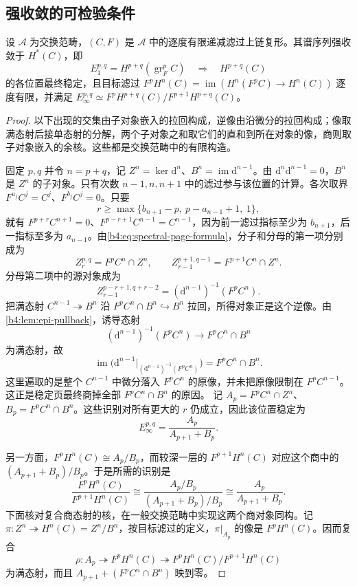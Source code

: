\subsection{强收敛的可检验条件}
\label{b4:subsec:1403:02}

\begin{theorem}\label{b4:thm:finite-filtration-convergence}
	设 \(\mathcal A\) 为交换范畴，\((C,F)\) 是 \(\mathcal A\) 中的逐度有限递减滤过上链复形。其谱序列强收敛于 \(H^*(C)\)，即
	\[
		E_1^{p,q}=H^{p+q}(\operatorname{gr}_F^pC) \quad\Longrightarrow\quad H^{p+q}(C)
	\]
	的各位置最终稳定，且目标滤过 \(F^pH^n(C)=\operatorname{im}(H^n(F^pC)\to H^n(C))\) 逐度有限，并满足 \(E_\infty^{p,q}\simeq F^pH^{p+q}(C)/F^{p+1}H^{p+q}(C)\)。
\end{theorem}
\begin{proof}
	以下出现的交集由子对象嵌入的拉回构成，逆像由沿微分的拉回构成；像取满态射后接单态射的分解，两个子对象之和取它们的直和到所在对象的像，商则取子对象嵌入的余核。这些都是交换范畴中的有限构造。

	固定 \(p,q\) 并令 \(n=p+q\)，记 \(Z^n=\ker \mathrm d^n\)、\(B^n=\operatorname{im}\mathrm d^{n-1}\)。由 \(\mathrm d^n\mathrm d^{n-1}=0\)，\(B^n\) 是 \(Z^n\) 的子对象。只有次数 \(n-1,n,n+1\) 中的滤过参与该位置的计算。各次取界 \(F^{a_j}C^j=C^j\)、\(F^{b_j}C^j=0\)。只要
	\[
		r\ge\max\{b_{n+1}-p,\ p-a_{n-1}+1,\ 1\},
	\]
	就有 \(F^{p+r}C^{n+1}=0\)、\(F^{p-r+1}C^{n-1}=C^{n-1}\)，因为前一滤过指标至少为 \(b_{n+1}\)，后一指标至多为 \(a_{n-1}\)。由\eqref{b4:eq:spectral-page-formula}，分子和分母的第一项分别成为
	\[
		Z_r^{p,q}=F^pC^n\cap Z^n,\qquad Z_{r-1}^{p+1,q-1}=F^{p+1}C^n\cap Z^n.
	\]
	分母第二项中的源对象成为
	\[
		Z_{r-1}^{p-r+1,q+r-2} =(\mathrm d^{n-1})^{-1}(F^pC^n).
	\]
	把满态射 \(C^{n-1}\twoheadrightarrow B^n\) 沿 \(F^pC^n\cap B^n\hookrightarrow B^n\) 拉回，所得对象正是这个逆像。由\cref{b4:lem:epi-pullback}，诱导态射
	\[
		(\mathrm d^{n-1})^{-1}(F^pC^n) \longrightarrow F^pC^n\cap B^n
	\]
	为满态射，故
	\[
		\operatorname{im}\bigl(\mathrm d^{n-1}|_{(\mathrm d^{n-1})^{-1}(F^pC^n)}\bigr) =F^pC^n\cap B^n.
	\]
	这里遍取的是整个 \(C^{n-1}\) 中微分落入 \(F^pC^n\) 的原像，并未把原像限制在 \(F^pC^{n-1}\)。这正是稳定页最终商掉全部 \(F^pC^n\cap B^n\) 的原因。 记 \(A_p=F^pC^n\cap Z^n\)、\(B_p=F^pC^n\cap B^n\)。这些识别对所有更大的 \(r\) 仍成立，因此该位置稳定为
	\[
		E_\infty^{p,q}= \frac{A_p}{A_{p+1}+B_p}.
	\]

	另一方面，\(F^pH^n(C)\cong A_p/B_p\)，而较深一层的 \(F^{p+1}H^n(C)\) 对应这个商中的 \((A_{p+1}+B_p)/B_p\)。于是所需的识别是
	\[
		\frac{F^pH^n(C)}{F^{p+1}H^n(C)} \cong\frac{A_p/B_p}{(A_{p+1}+B_p)/B_p} \cong\frac{A_p}{A_{p+1}+B_p}.
	\]
	下面核对复合商态射的核，在一般交换范畴中实现这两个商对象同构。记 \(\pi:Z^n\twoheadrightarrow H^n(C)=Z^n/B^n\)，按目标滤过的定义，\(\pi|_{A_p}\) 的像是 \(F^pH^n(C)\)。因而复合
	\[
		\rho:A_p\twoheadrightarrow F^pH^n(C) \twoheadrightarrow F^pH^n(C)/F^{p+1}H^n(C)
	\]
	为满态射，而且 \(A_{p+1}+(F^pC^n\cap B^n)\) 映到零。


\end{proof}
